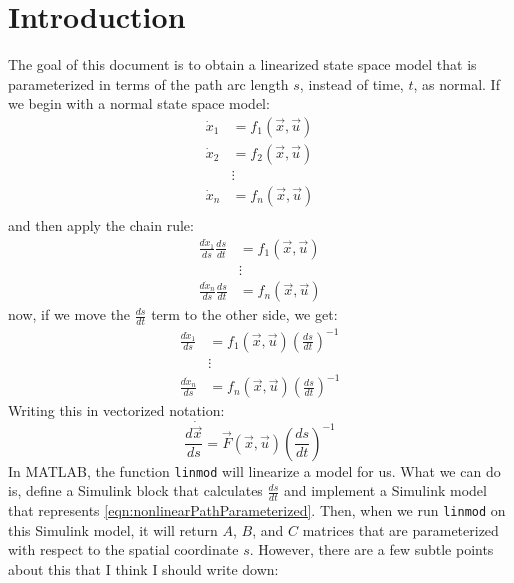 \documentclass[12pt]{article}
\begin{document}
\section*{Introduction}
The goal of this document is to obtain a linearized state space model that is parameterized in terms of the path arc length $s$, instead of time, $t$, as normal.  If we begin with a normal state space model:
\begin{equation}\begin{split}
\dot{x}_1&=f_1(\vec{x},\vec{u})\\
\dot{x}_2&=f_2(\vec{x},\vec{u})\\
&\vdots\\
\dot{x}_n&=f_n(\vec{x},\vec{u})\\
\end{split}
\end{equation}
and then apply the chain rule:
\begin{equation}
\begin{split}
\frac{d\dot{x}_1}{ds}\frac{ds}{dt}&=f_1(\vec{x},\vec{u})\\
&\vdots\\
\frac{d\dot{x}_n}{ds}\frac{ds}{dt}&=f_n(\vec{x},\vec{u})
\end{split}
\end{equation}
now, if we move the $\frac{ds}{dt}$ term to the other side, we get:
\begin{equation}
\begin{split}
\frac{d\dot{x}_1}{ds}&=f_1(\vec{x},\vec{u})\left(\frac{ds}{dt}\right)^{-1}\\
&\vdots\\
\frac{d\dot{x}_n}{ds}&=f_n(\vec{x},\vec{u})\left(\frac{ds}{dt}\right)^{-1}
\end{split}
\end{equation}
Writing this in vectorized notation:
\begin{equation}\label{eqn:nonlinearPathParameterized}
\frac{d\dot{\vec{x}}}{ds}=\vec{F}(\vec{x},\vec{u})\left(\frac{ds}{dt}\right)^{-1}
\end{equation}
In MATLAB, the function \texttt{linmod} will linearize a model for us.  What we can do is, define a Simulink block that calculates $\frac{ds}{dt}$ and implement a Simulink model that represents \ref{eqn:nonlinearPathParameterized}.  Then, when we run \texttt{linmod} on this Simulink model, it will return $A$, $B$, and $C$ matrices that are parameterized with respect to the spatial coordinate $s$.  However, there are a few subtle points about this that I think I should write down:
\end{document}
